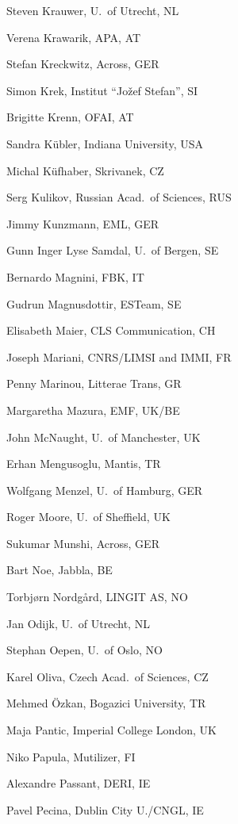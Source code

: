 \documentclass[10pt, plain]{../../metanetpaper}
\begin{document}
\begin{multicols}{3}
\begin{footnotesize}
\begin{enumerate}
{      \item Steven Krauwer, U.~of Utrecht, NL
      \item Verena Krawarik, APA, AT
      \item Stefan Kreckwitz, Across, GER
      \item Simon Krek, Institut ``Jožef Stefan'', SI
      \item Brigitte Krenn, OFAI, AT
      \item Sandra Kübler, Indiana University, USA
      \item Michal Küfhaber, Skrivanek, CZ
      \item Serg Kulikov, Russian Acad.~of Sciences, RUS
      \item Jimmy Kunzmann, EML, GER
      \item Gunn Inger Lyse Samdal, U.~of Bergen, SE
      \item Bernardo Magnini, FBK, IT
      \item Gudrun Magnusdottir, ESTeam, SE
      \item Elisabeth Maier, CLS Communication, CH
      \item Joseph Mariani, CNRS/LIMSI and IMMI, FR
      \item Penny Marinou, Litterae Trans, GR
      \item Margaretha Mazura, EMF, UK/BE
      \item John McNaught, U.~of Manchester, UK
      \item Erhan Mengusoglu, Mantis, TR
      \item Wolfgang Menzel, U.~of Hamburg, GER
      \item Roger Moore, U.~of Sheffield, UK
      \item Sukumar Munshi, Across, GER
      \item Bart Noe, Jabbla, BE
      \item Torbjørn Nordgård, LINGIT AS, NO
      \item Jan Odijk, U.~of Utrecht, NL
      \item Stephan Oepen, U.~of Oslo, NO
      \item Karel Oliva, Czech Acad.~of Sciences, CZ
      \item Mehmed Özkan, Bogazici University, TR
      \item Maja Pantic, Imperial College London, UK
      \item Niko Papula, Mutilizer, FI
      \item Alexandre Passant, DERI, IE
      \item Pavel Pecina, Dublin City U./CNGL, IE
}
\end{enumerate}
\end{footnotesize}
\end{multicols}
\end{document}
